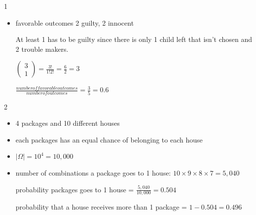 \documentclass[12 pt]{article}
\begin{document}
\begin{exercise}{1}
\begin{itemize}
        \item favorable outcomes 2 guilty, 2 innocent

        At least 1 has to be guilty since there is only 1 child left that isn't chosen and 2 trouble makers.

        $\begin{pmatrix}
            3 \\
            1
        \end{pmatrix} = \frac{3!}{1!2!} = \frac{6}{2} = 3$

        $\frac{number of favorable outcomes}{number of outcomes} = \frac{3}{5} = 0.6$
    \end{itemize}
        
    \end{exercise}



    \begin{exercise}{2}
    \hfill 

    \begin{itemize}
        \item 4 packages and 10 different houses
        \item each packages has an equal chance of belonging to each house
        \item $| \Omega | = 10^4 = 10,000$
        \item number of combinations a package goes to 1 house: $10 \times 9 \times 8 \times 7 = 5,040$

        probability packages goes to 1 house = $\frac{5,040}{10,000} = 0.504$

        probability that a house receives more than 1 package = $1 - 0.504 = 0.496$
    \end{itemize}
    \end{exercise}
\end{document}
